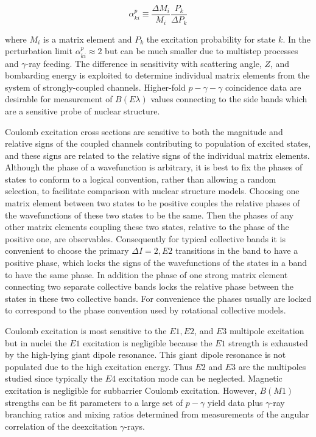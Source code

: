 \documentclass[10pt]{article}
\begin{document}
$$
\alpha_{k i}^{p} \equiv \frac{\Delta M_{i}}{M_{i}} \frac{P_{k}}{\Delta P_{k}}
$$

where $M_{i}$ is a matrix element and $P_{k}$ the excitation probability for state $k$. In the perturbation limit $\alpha_{k i}^{p} \approx 2$ but can be much smaller due to multistep processes and $\gamma$-ray feeding. The difference in sensitivity with scattering angle, $Z$, and bombarding energy is exploited to determine individual matrix elements from the system of strongly-coupled channels. Higher-fold $p-\gamma-\gamma$ coincidence data are desirable for measurement of $B(E \lambda)$ values connecting to the side bands which are a sensitive probe of nuclear structure.

Coulomb excitation cross sections are sensitive to both the magnitude and relative signs of the coupled channels contributing to population of excited states, and these signs are related to the relative signs of the individual matrix elements. Although the phase of a wavefunction is arbitrary, it is best to fix the phases of states to conform to a logical convention, rather than allowing a random selection, to facilitate comparison with nuclear structure models. Choosing one matrix element between two states to be positive couples the relative phases of the wavefunctions of these two states to be the same. Then the phases of any other matrix elements coupling these two states, relative to the phase of the positive one, are observables. Consequently for typical collective bands it is convenient to choose the primary $\Delta I=2, E 2$ transitions in the band to have a positive phase, which locks the signs of the wavefunctions of the states in a band to have the same phase. In addition the phase of one strong matrix element connecting two separate collective bands locks the relative phase between the states in these two collective bands. For convenience the phases usually are locked to correspond to the phase convention used by rotational collective models.

Coulomb excitation is most sensitive to the $E 1, E 2$, and $E 3$ multipole excitation but in nuclei the $E 1$ excitation is negligible because the $E 1$ strength is exhausted by the high-lying giant dipole resonance. This giant dipole resonance is not populated due to the high excitation energy. Thus $E 2$ and $E 3$ are the multipoles studied since typically the $E 4$ excitation mode can be neglected. Magnetic excitation is negligible for subbarrier Coulomb excitation. However, $B(M 1)$ strengths can be fit parameters to a large set of $p-\gamma$ yield data plus $\gamma$-ray branching ratios and mixing ratios determined from measurements of the angular correlation of the deexcitation $\gamma$-rays.
\end{document}
